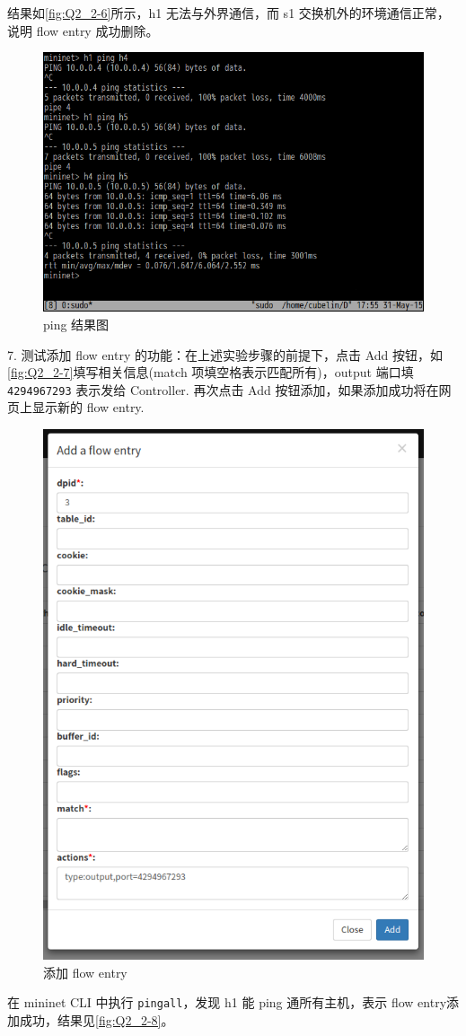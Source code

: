 \documentclass[format=draft,language=chinese,category=SDN]{hustreport}
\newcommand{\code}{\texttt}
\begin{document}
结果如\autoref{fig:Q2_2-6}所示，h1 无法与外界通信，而 s1 交换机外的环境通信正常，说明 flow entry 成功删除。

\begin{figure}[!h]
\centering
\includegraphics[width=.618\textwidth]{fig/2_2-6.png}
\caption{ping 结果图}\label{fig:Q2_2-6}
\end{figure}

7. 测试添加 flow entry 的功能：在上述实验步骤的前提下，点击 Add 按钮，如\autoref{fig:Q2_2-7}填写相关信息(match 项填空格表示匹配所有)，output 端口填 \code{4294967293} 表示发给 Controller. 再次点击 Add 按钮添加，如果添加成功将在网页上显示新的 flow entry.

\begin{figure}[!h]
\centering
\includegraphics[width=.618\textwidth]{fig/2_2-7.png}
\caption{添加 flow entry}\label{fig:Q2_2-7}
\end{figure}

在 mininet CLI 中执行 \code{pingall}，发现 h1 能 ping 通所有主机，表示 flow entry添加成功，结果见\autoref{fig:Q2_2-8}。
\end{document}
